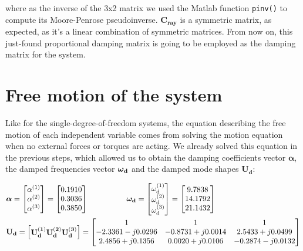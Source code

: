 \documentclass[a4paper,12pt,oneside]{article}
\begin{document}
where as the inverse of the 3x2 matrix we used the Matlab function \lstinline!pinv()! to compute its Moore-Penrose pseudoinverse. $ \mathbf{C_{ray}} $ is a symmetric matrix, as expected, as it's a linear combination of symmetric matrices. From now on, this just-found proportional damping matrix is going to be employed as the damping matrix for the system.


\section{Free motion of the system}
\label{sec:free_motion}

Like for the single-degree-of-freedom systems, the equation describing the free motion of each independent variable comes from solving the motion equation when no external forces or torques are acting. We already solved this equation in the previous steps, which allowed us to obtain the damping coefficients vector $ \bm{\alpha} $, the damped frequencies vector $ \bm{\omega_\textup{\textbf{d}}} $ and the damped mode shapes $ \mathbf{U_d} $:

\[ \begin{split}
	& \bm{\alpha} =	\begin{bmatrix}
									\alpha^{(1)} \\
									\alpha^{(2)} \\
									\alpha^{(3)}
								\end{bmatrix} = \begin{bmatrix}
																	0.1910 \\
																	0.3036 \\
																	0.3850
																\end{bmatrix} \hspace{50pt}
		\bm{\omega_\textup{\textbf{d}}} =	\begin{bmatrix}
																				\omega_\textup{d}^{(1)} \\
																				\omega_\textup{d}^{(2)} \\
																				\omega_\textup{d}^{(3)} \\
																			\end{bmatrix} = \begin{bmatrix}
																												9.7838 \\
																												14.1792 \\
																												21.1432
																											\end{bmatrix} \\
	& \mathbf{U_d} =	\begin{bmatrix}
											\mathbf{U_d^{(1)}}
											\mathbf{U_d^{(2)}}
											\mathbf{U_d^{(3)}}
										\end{bmatrix} =
		\begin{bmatrix}
			1									& 1									& 1 \\
			-2.3361 - j0.0296	& -0.8731 + j0.0014	& 2.5433 + j0.0499 \\
			2.4856 + j0.1356	& 0.0020 + j0.0106	& -0.2874 -j0.0132
		\end{bmatrix}
\end{split} \]
\end{document}
